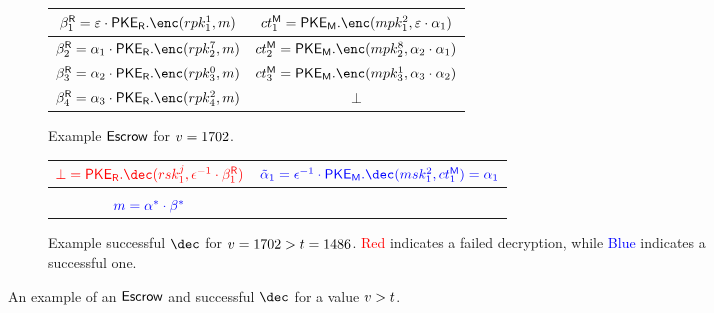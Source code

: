 \begin{figure}[ht]
	\centering
	\begin{tcolorbox}[sharp corners,colback=white,boxrule=0.3mm,left=1mm]
		\begin{subfigure}{\textwidth}
			\centering
			\begin{tabular}{|c|c|}
				\hline
				$\otpct_1^\rev =  \varepsilon \cdot \pker.\enc(\revpk^1_1, m) $
				 & $ct^\mat_1 =  \pkem.\enc(\matpk^{2}_1, \varepsilon \cdot \alpha_1) $ \\
				\hline
				$\otpct_2^\rev= \alpha_1 \cdot \pker.\enc(\revpk^7_2, m ) $
				 & $ct^\mat_2 =  \pkem.\enc(\matpk^8_2, \alpha_2 \cdot \alpha_1) $      \\
				\hline
				$\otpct_3^\rev=  \alpha_2 \cdot \pker.\enc(\revpk^0_3, m) $
				 & $ct^\mat_3 =  \pkem.\enc(\matpk^1_3, \alpha_3 \cdot \alpha_2) $      \\
				\hline
				$\otpct_4^\rev =  \alpha_3 \cdot \pker.\enc(\revpk^2_4, m ) $
				 & $\bot$                                                               \\
				\hline
			\end{tabular}
			\caption{Example ${\sf Escrow}$ for $v = 1702$.}
		\end{subfigure}

		\vspace{1.5em}

		\begin{subfigure}{\textwidth}
			\centering
			\begin{tabular}{|c|c|}
				\hline
				$\textcolor{red}{\bot =  \pker.\dec(\revsk^j_1, \epsilon^{-1} \cdot \otpct^\rev_1)} $                  &
				$\textcolor{blue}{\tilde{\otpk}_1 = \epsilon^{-1} \cdot \pkem.\dec(\matsk^{2}_1, ct^\mat_1) =\alpha_1} $ \\
				\hline
				\makecell{
					$\textcolor{blue}{\otpk^* = \pker.\dec(\revsk^7_{2}, (\tilde{\otpk}_1)^{-1} \cdot \otpct^\rev_2)}$ \\
					$\textcolor{blue}{m = \alpha^* \cdot \beta^*}$
				} &      \\
				\hline
			\end{tabular}
			\caption{Example successful $\dec$ for $v = 1702 > t = 1486$. \textcolor{red}{Red} indicates a failed decryption, while \textcolor{blue}{Blue} indicates a successful one.}
		\end{subfigure}
	\end{tcolorbox}
	\caption{An example of an ${\sf Escrow}$ and successful $\dec$ for a value $v > t$.}
	\label{fig:successful_dec_example}
\end{figure}
